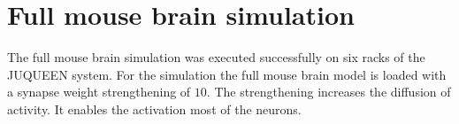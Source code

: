 \section{Full mouse brain simulation}
The full mouse brain simulation was executed successfully on six racks of the JUQUEEN system.
For the simulation the full mouse brain model is loaded with a synapse weight strengthening of $10$.
The strengthening increases the diffusion of activity.
It enables the activation most of the neurons.
\begin{figure}[ht!]
     \begin{center}
\end{center}
\end{figure}
